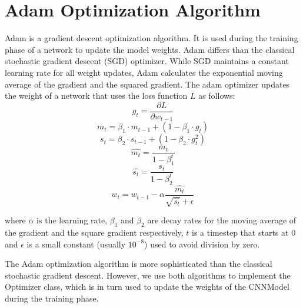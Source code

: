 \section{Adam Optimization Algorithm}\label{sec:adam_algorithm}
Adam \cite{kingma2014adam} is a gradient descent optimization algorithm. It is used during the training phase of a network to update the model weights. Adam differs than the classical stochastic gradient descent (SGD) optimizer. While SGD maintains a constant learning rate for all weight updates, Adam calculates the exponential moving average of the gradient and the squared gradient. The adam optimizer updates the weight of a network that uses the loss function $L$ as follows:
\[g_{t}=\dfrac{\partial L}{\partial w_{t-1}}\]
\[m_{t}=\beta_{1}\cdot m_{t-1}+(1-\beta_{1}\cdot g_{t})\]
\[s_{t}=\beta_{2}\cdot s_{t-1}+(1-\beta_{2}\cdot g_{t}^2)\]
\[\hat{m_{t}}=\dfrac{m_{t}}{1 - \beta_{1}^t}\]
\[\hat{s_{t}}=\dfrac{s_{t}}{1 - \beta_{2}^t}\]
\[w_{t}=w_{t-1}-\alpha\dfrac{\hat{m_{t}}}{\sqrt{\hat{s_{t}}}+\epsilon}\]

where $\alpha$ is the learning rate, $\beta_1$ and $\beta_2$ are decay rates for the moving average of the gradient and the square gradient respectively, $t$ is a timestep that starts at 0 and $\epsilon$ is a small constant (usually $10^{-8}$) used to avoid division by zero.

The Adam optimization algorithm is more sophisticated than the classical stochastic gradient descent. However, we use both algorithms to implement the Optimizer class, which is in turn used to update the weights of the CNNModel during the training phase.
